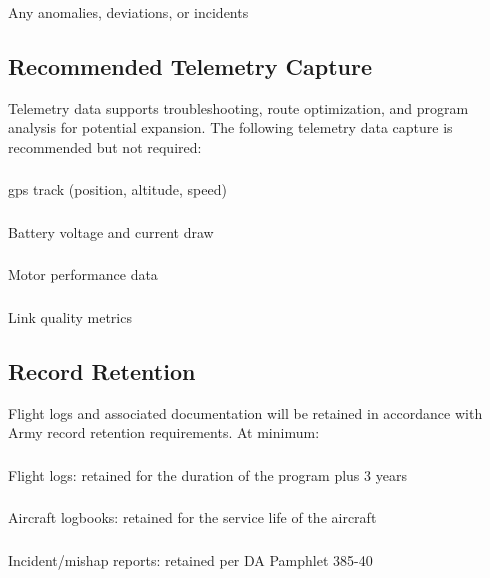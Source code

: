         \subsubsection{} Any anomalies, deviations, or incidents

    \subsection{Recommended Telemetry Capture}\label{ssec:telemetrycapture}
    Telemetry data supports troubleshooting, route optimization, and program analysis for potential expansion. The following telemetry data capture is recommended but not required:
        
        \subsubsection{} \ac{gps} track (position, altitude, speed)
        \subsubsection{} Battery voltage and current draw
        \subsubsection{} Motor performance data
        \subsubsection{} Link quality metrics

    \subsection{Record Retention}\label{ssec:recordretention} 
    Flight logs and associated documentation will be retained in accordance with Army record retention requirements. At minimum:
    
        \subsubsection{} Flight logs: retained for the duration of the program plus 3 years
        \subsubsection{} Aircraft logbooks: retained for the service life of the aircraft
        \subsubsection{} Incident/mishap reports: retained per DA Pamphlet 385-40

